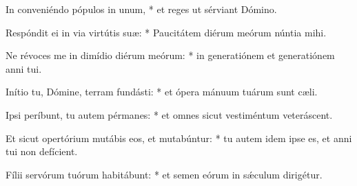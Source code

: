 \begin{psalmus}
In conveniéndo pópulos in unum, * et reges ut sérviant Dómino.

Respóndit ei in via virtútis suæ: * Paucitátem diérum meórum núntia mihi.

Ne révoces me in dimídio diérum meórum: * in generatiónem et generatiónem anni tui.

Inítio tu, Dómine, terram fundásti: * et ópera mánuum tuárum sunt cæli.

Ipsi períbunt, tu autem pérmanes: * et omnes sicut vestiméntum veteráscent.

Et sicut opertórium mutábis eos, et mutabúntur: * tu autem idem ipse es, et anni tui non defícient.

Fílii servórum tuórum habitábunt: * et semen eórum in sǽculum dirigétur.

\end{psalmus}
